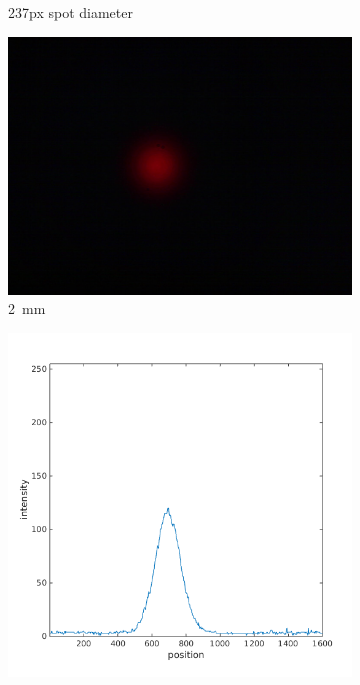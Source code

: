 \documentclass[a4paper, 12pt]{paper}
\begin{document}
\begin{figure}[H]
\begin{subfigure}[t]{0.4\textwidth}
        \caption{237px spot diameter}
    \end{subfigure}
    \begin{subfigure}[t]{0.5\textwidth}
        \includegraphics[width=\textwidth]{img/2mm.jpg}
        \caption{\SI{2}{\milli\meter}}
    \end{subfigure}
    \begin{subfigure}[t]{0.4\textwidth}
        \includegraphics[width=\textwidth]{img/2mm_line}

\end{subfigure}
\end{figure}
\end{document}
